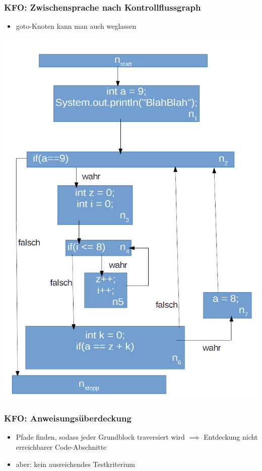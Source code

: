 \documentclass[18pt]{beamer}
\begin{document}
	\begin{frame}
		\frametitle{KFO: Zwischensprache nach Kontrollflussgraph}
		\begin{itemize}
			\item goto-Knoten kann man auch weglassen
		\end{itemize}
		\centering \includegraphics[scale=0.2]{./pics/tut5/test-without-goto.png}
	\end{frame}

	\begin{frame}
		\frametitle{KFO: Anweisungsüberdeckung}
		\begin{itemize}
			\item Pfade finden, sodass jeder Grundblock traversiert wird \pause
			\linebreak $\implies$ Entdeckung nicht erreichbarer Code-Abschnitte \pause
			\item aber: kein ausreichendes Testkriterium
		\end{itemize}
	\end{frame}
\end{document}
